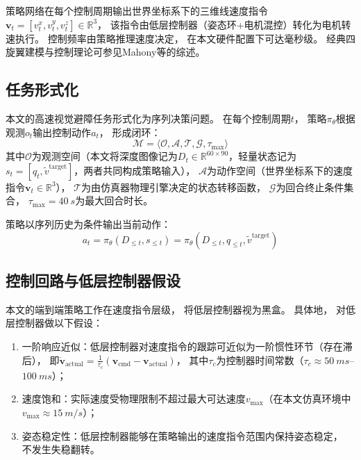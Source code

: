 策略网络在每个控制周期输出世界坐标系下的三维线速度指令$\mathbf{v}_t = [v^x_t, v^y_t, v^z_t] \in \mathbb{R}^3$，
该指令由低层控制器（姿态环+电机混控）转化为电机转速执行。
控制频率由策略推理速度决定，
在本文硬件配置下可达毫秒级。
经典四旋翼建模与控制理论可参见Mahony等\cite{Mahony2012QuadrotorSurvey}的综述。

\subsection{任务形式化}

本文的高速视觉避障任务形式化为序列决策问题。
在每个控制周期$t$，
策略$\pi_\theta$根据观测$o_t$输出控制动作$a_t$，
形成闭环：
\begin{equation}
  \mathcal{M} = \langle \mathcal{O}, \mathcal{A}, \mathcal{T}, \mathcal{G}, \tau_{\max} \rangle
  \label{eq:task_tuple}
\end{equation}
其中$\mathcal{O}$为观测空间（本文将深度图像记为$D_t \in \mathbb{R}^{60 \times 90}$，轻量状态记为$s_t = [q_t, \tilde{v}^{\text{target}}]$，两者共同构成策略输入），
$\mathcal{A}$为动作空间（世界坐标系下的速度指令$\mathbf{v}_t \in \mathbb{R}^3$），
$\mathcal{T}$为由仿真器物理引擎决定的状态转移函数，
$\mathcal{G}$为回合终止条件集合，
$\tau_{\max} = \SI{40}{s}$为最大回合时长。

策略以序列历史为条件输出当前动作：
\begin{equation}
  a_t = \pi_\theta(D_{\le t}, s_{\le t}) = \pi_\theta(D_{\le t}, q_{\le t}, \tilde{v}^{\text{target}})
  \label{eq:policy}
\end{equation}

\subsection{控制回路与低层控制器假设}

本文的端到端策略工作在速度指令层级，
将低层控制器视为黑盒。
具体地，
对低层控制器做以下假设：

\begin{enumerate}
  \item 一阶响应近似：低层控制器对速度指令的跟踪可近似为一阶惯性环节（存在滞后），
    即$\dot{\mathbf{v}}_{\text{actual}} = \frac{1}{\tau_c}(\mathbf{v}_{\text{cmd}} - \mathbf{v}_{\text{actual}})$，
    其中$\tau_c$为控制器时间常数（$\tau_c \approx \SI{50}{ms}$--$\SI{100}{ms}$）；
 \item 速度饱和：实际速度受物理限制不超过最大可达速度$v_{\max}$（在本文仿真环境中$v_{\max} \approx \SI{15}{m/s}$）；
     \item 姿态稳定性：低层控制器能够在策略输出的速度指令范围内保持姿态稳定，
    不发生失稳翻转。
     \end{enumerate}

